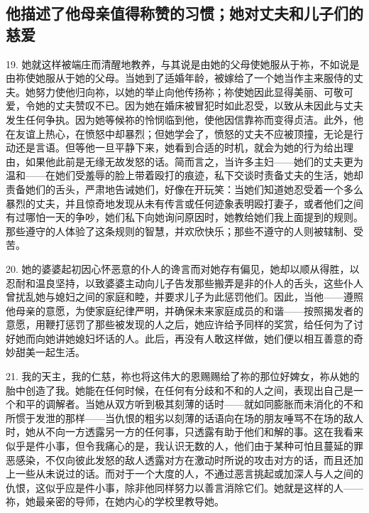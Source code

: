 
\subsection{他描述了他母亲值得称赞的习惯；她对丈夫和儿子们的慈爱}

19. 她就这样被端庄而清醒地教养，与其说是由她的父母使她服从于祢，不如说是由祢使她服从于她的父母。当她到了适婚年龄，被嫁给了一个她当作主来服侍的丈夫。她努力使他归向祢，以她的举止向他传扬祢；祢使她因此显得美丽、可敬可爱，令她的丈夫赞叹不已。因为她在婚床被冒犯时如此忍受，以致从未因此与丈夫发生任何争执。因为她等候祢的怜悯临到他，使他因信靠祢而变得贞洁。此外，他在友谊上热心，在愤怒中却暴烈；但她学会了，愤怒的丈夫不应被顶撞，无论是行动还是言语。但等他一旦平静下来，她看到合适的时机，就会为她的行为给出理由，如果他此前是无缘无故发怒的话。简而言之，当许多主妇——她们的丈夫更为温和——在她们受羞辱的脸上带着殴打的痕迹，私下交谈时责备丈夫的生活，她却责备她们的舌头，严肃地告诫她们，好像在开玩笑：当她们知道她忍受着一个多么暴烈的丈夫，并且惊奇地发现从未有传言或任何迹象表明殴打妻子，或者他们之间有过哪怕一天的争吵，她们私下向她询问原因时，她教给她们我上面提到的规则。那些遵守的人体验了这条规则的智慧，并欢欣快乐；那些不遵守的人则被辖制、受苦。\par

20. 她的婆婆起初因心怀恶意的仆人的谗言而对她存有偏见，她却以顺从得胜，以忍耐和温良坚持，以致婆婆主动向儿子告发那些搬弄是非的仆人的舌头，这些仆人曾扰乱她与媳妇之间的家庭和睦，并要求儿子为此惩罚他们。因此，当他——遵照他母亲的意愿，为使家庭纪律严明，并确保未来家庭成员的和谐——按照揭发者的意愿，用鞭打惩罚了那些被发现的人之后，她应许给予同样的奖赏，给任何为了讨好她而向她讲她媳妇坏话的人。此后，再没有人敢这样做，她们便以相互善意的奇妙甜美一起生活。\par

21. 我的天主，我的仁慈，祢也将这伟大的恩赐赐给了祢的那位好婢女，祢从她的胎中创造了我。她能在任何时候，在任何有分歧和不和的人之间，表现出自己是一个和平的调解者。当她从双方听到极其刻薄的话时——就如同膨胀而未消化的不和所惯于发泄的那样——当仇恨的粗劣以刻薄的话语向在场的朋友唾骂不在场的敌人时，她从不向一方透露另一方的任何事，只透露有助于他们和解的事。这在我看来似乎是件小事，但令我痛心的是，我认识无数的人，他们由于某种可怕且蔓延的罪恶感染，不仅向彼此发怒的敌人透露对方在激动时所说的攻击对方的话，而且还加上一些从未说过的话。而对于一个大度的人，不通过恶言挑起或加深人与人之间的仇恨，这似乎应是件小事，除非他同样努力以善言消除它们。她就是这样的人——祢，她最亲密的导师，在她内心的学校里教导她。\par

